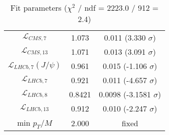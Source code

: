 \begin{table}[h!]
\begin{tabular}{c|c|c}
$\mathcal L_{CMS,7}$ & 1.073 & 0.011 (3.330 $\sigma$) \\
$\mathcal L_{CMS,13}$ & 1.071 & 0.013 (3.091 $\sigma$) \\
$\mathcal L_{LHCb,7}(J/\psi)$ & 0.961 & 0.015 (-1.106 $\sigma$) \\
$\mathcal L_{LHCb,7}$ & 0.921 & 0.011 (-4.657 $\sigma$) \\
$\mathcal L_{LHCb,8}$ & 0.8421 & 0.0098 (-3.1581 $\sigma$) \\
$\mathcal L_{LHCb,13}$ & 0.912 & 0.010 (-2.247 $\sigma$) \\
min $p_T/M$ & 2.000 & fixed \\
\end{tabular}
\caption{Fit parameters ($\chi^2$ / ndf = 2223.0 / 912 = 2.4)}
\end{table}
